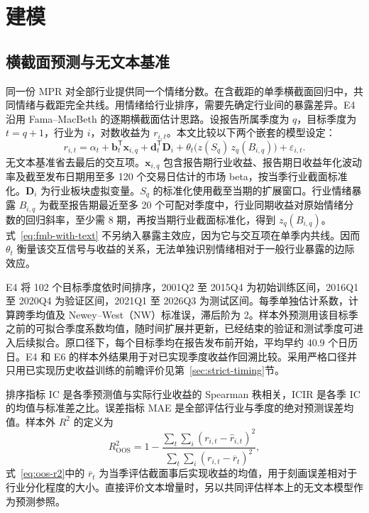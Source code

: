 \section{建模}\label{sec:models}

\subsection{横截面预测与无文本基准}

同一份 MPR 对全部行业提供同一个情绪分数。在含截距的单季横截面回归中，共同情绪与截距完全共线。用情绪给行业排序，需要先确定行业间的暴露差异。E4 沿用 Fama--MacBeth 的逐期横截面估计思路\cite{famaMacBeth1973}。设报告所属季度为 $q$，目标季度为 $t=q+1$，行业为 $i$，对数收益为 $r_{i,t}$。本文比较以下两个嵌套的模型设定：
\begin{equation}
  r_{i,t}=\alpha_t+\boldsymbol{b}_t^{\mathsf T}\boldsymbol{x}_{i,q}
     +\boldsymbol{d}_t^{\mathsf T}\boldsymbol{D}_i
     +\theta_t\bigl(z(S_q)\,z_q(B_{i,q})\bigr)+\varepsilon_{i,t}.
  \label{eq:fmb-with-text}
\end{equation}
无文本基准省去最后的交互项。$\boldsymbol{x}_{i,q}$ 包含报告期行业收益、报告期日收益年化波动率及截至发布日期用至多 120 个交易日估计的市场 beta，按当季行业截面标准化。$\boldsymbol{D}_i$ 为行业板块虚拟变量。$S_q$ 的标准化使用截至当期的扩展窗口。行业情绪暴露 $B_{i,q}$ 为截至报告期最近至多 20 个可配对季度中，行业同期收益对原始情绪分数的回归斜率，至少需 8 期，再按当期行业截面标准化，得到 $z_q(B_{i,q})$。式~\eqref{eq:fmb-with-text} 不另纳入暴露主效应，因为它与交互项在单季内共线。因而 $\theta_t$ 衡量该交互信号与收益的关系，无法单独识别情绪相对于一般行业暴露的边际效应。

E4 将 102 个目标季度依时间排序，2001Q2 至 2015Q4 为初始训练区间，2016Q1 至 2020Q4 为验证区间，2021Q1 至 2026Q3 为测试区间。每季单独估计系数，计算跨季均值及 Newey--West（NW）标准误，滞后阶为 2\cite{neweyWest1987}。样本外预测用该目标季之前的可拟合季度系数均值，随时间扩展并更新，已经结束的验证和测试季度可进入后续拟合。原口径下，每个目标季均在报告发布前开始，平均早约 40.9 个日历日。E4 和 E6 的样本外结果用于对已实现季度收益作回溯比较。采用严格口径并只用已实现历史收益训练的前瞻评价见第~\ref{sec:strict-timing}节。

排序指标 IC 是各季预测值与实际行业收益的 Spearman 秩相关，ICIR 是各季 IC 的均值与标准差之比。误差指标 MAE 是全部评估行业与季度的绝对预测误差均值。样本外 $R^2$ 的定义为
\begin{equation}
  R^2_{\mathrm{OOS}}=1-\frac{\sum_t\sum_i(r_{i,t}-\widehat r_{i,t})^2}
                {\sum_t\sum_i(r_{i,t}-\overline r_t)^2},
  \label{eq:oos-r2}
\end{equation}
式~\eqref{eq:oos-r2}中的 $\overline r_t$ 为当季评估截面事后实现收益的均值，用于刻画误差相对于行业分化程度的大小。直接评价文本增量时，另以共同评估样本上的无文本模型作为预测参照。

